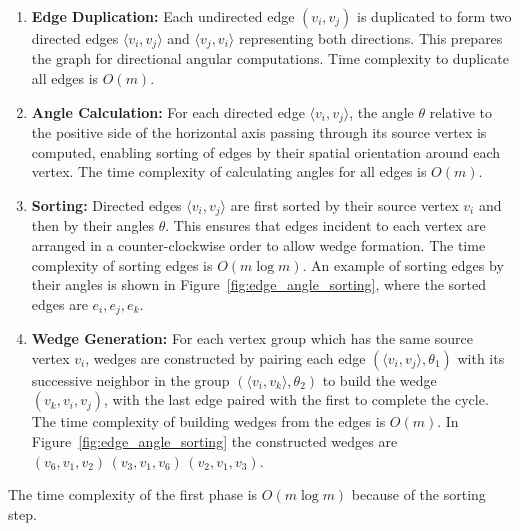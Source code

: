 \begin{enumerate}
    \item \textbf{Edge Duplication:} Each undirected edge \( (v_i, v_j) \) is duplicated to form two directed edges \( \langle v_i, v_j\rangle \) and \( \langle v_j, v_i\rangle \) representing both directions. This prepares the graph for directional angular computations. Time complexity to duplicate all edges is \( O(m) \).
    \item \textbf{Angle Calculation:} For each directed edge \( \langle v_i, v_j\rangle \), the angle \( \theta\) relative to the positive side of the horizontal axis passing through its source vertex is computed, enabling sorting of edges by their spatial orientation around each vertex. The time complexity of calculating angles for all edges is \( O(m) \).
    \item \textbf{Sorting:} Directed edges \( \langle v_i, v_j\rangle \) are first sorted by their source vertex \( v_i\) and then by their angles \( \theta \). This ensures that edges incident to each vertex are arranged in a counter-clockwise order to allow wedge formation. The time complexity of sorting edges is \( O(m \log m) \). An example of sorting edges by their angles is shown in Figure~\ref{fig:edge_angle_sorting}, where the sorted edges are \(e_i, e_j, e_k\).
    \item \textbf{Wedge Generation:} For each vertex group which has the same source vertex \( v_i \), wedges are constructed by pairing each edge \((\langle v_i, v_j \rangle, \theta_1)\) with its successive neighbor in the group \((\langle v_i, v_k \rangle, \theta_2)\) to build the wedge \( (v_k, v_i, v_j) \), with the last edge paired with the first to complete the cycle. The time complexity of building wedges from the edges is \( O(m) \). In Figure~\ref{fig:edge_angle_sorting} the constructed wedges are \((v_6, v_1, v_2)\, (v_3, v_1, v_6)\, (v_2, v_1, v_3)\).
\end{enumerate}

The time complexity of the first phase is \(O(m \log m)\) because of the sorting step.

